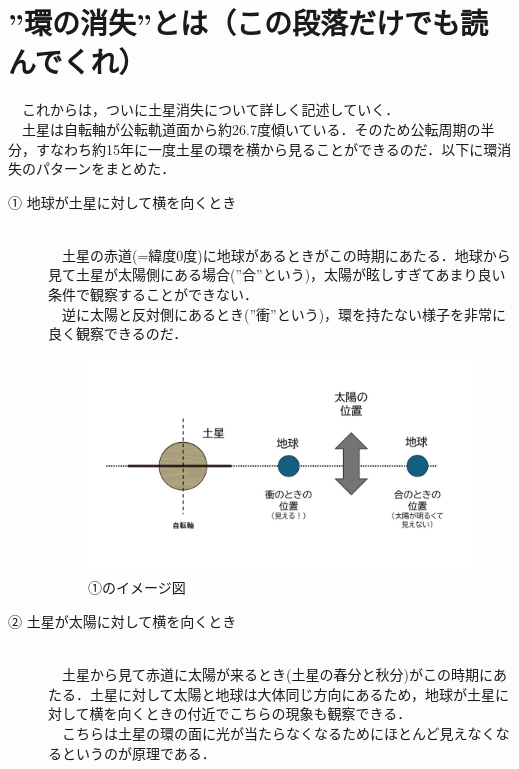\documentclass[../main]{subfiles}
\begin{document}
\newpage

\section{”環の消失”とは（この段落だけでも読んでくれ）}
　これからは，ついに土星消失について詳しく記述していく．\\
　土星は自転軸が公転軌道面から約26.7度傾いている．そのため公転周期の半分，すなわち約15年に一度土星の環を横から見ることができるのだ．以下に環消失のパターンをまとめた．


\begin{description}
    \item[① 地球が土星に対して横を向くとき]\mbox{}\\
    　土星の赤道(=緯度0度)に地球があるときがこの時期にあたる．地球から見て土星が太陽側にある場合(”合”という)，太陽が眩しすぎてあまり良い条件で観察することができない．\\
　逆に太陽と反対側にあるとき(”衝”という)，環を持たない様子を非常に良く観察できるのだ．
   \begin{figure}[H]
    \centering
    \includegraphics[width=14cm]{sections/kurahara/部誌用/スライド1.JPG}
    \caption{①のイメージ図}
\end{figure}


    \item [② 土星が太陽に対して横を向くとき]\mbox{}\\
    　土星から見て赤道に太陽が来るとき(土星の春分と秋分)がこの時期にあたる．土星に対して太陽と地球は大体同じ方向にあるため，地球が土星に対して横を向くときの付近でこちらの現象も観察できる．\\
　こちらは土星の環の面に光が当たらなくなるためにほとんど見えなくなるというのが原理である．


\end{description}
\end{document}
